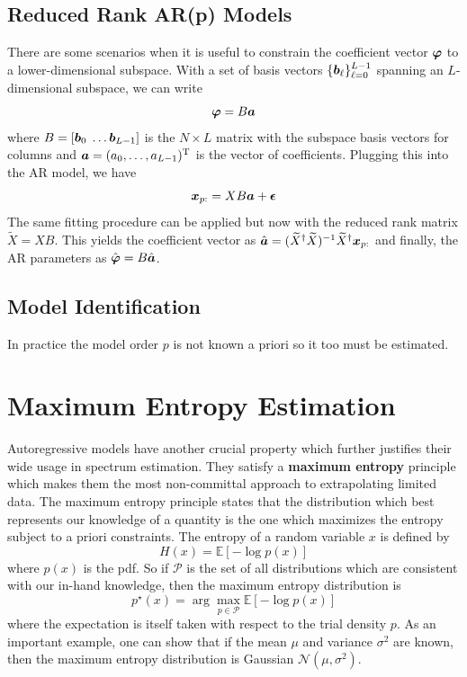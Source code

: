 \documentclass[twocolumn]{gwclass}
\begin{document}
\subsection{Reduced Rank AR(p) Models}
There are some scenarios when it is useful to constrain the coefficient vector $\boldsymbol{\varphi}$ to a lower-dimensional subspace. With a set of basis vectors $\{\boldsymbol{b}_\ell\}_{\ell=0}^{L-1}$ spanning an $L$-dimensional subspace, we can write
$$ \boldsymbol{\varphi} = B\boldsymbol{a} $$
where $B=[\boldsymbol{b}_0\;\dots\boldsymbol{b}_{L-1}]$ is the $N\times L$ matrix with the subspace basis vectors for columns and $\boldsymbol{a}=(a_0,\dots,a_{L-1})^{\text{\normalfont{T}}}$ is the vector of coefficients. Plugging this into the AR model, we have
$$ \boldsymbol{x}_{p:}=XB\boldsymbol{a} + \boldsymbol{\epsilon} $$
The same fitting procedure can be applied but now with the reduced rank matrix $\widetilde{X}=XB$. This yields the coefficient vector as $\hat{\boldsymbol{a}}=(\widetilde{X}^\dagger\widetilde{X})^{-1}\widetilde{X}^\dagger\boldsymbol{x}_{p:}$ and finally, the AR parameters as $\hat{\boldsymbol{\varphi}} = B\hat{\boldsymbol{a}}$.


\subsection{Model Identification}
In practice the model order $p$ is not known a priori so it too must be estimated.
 



\section{Maximum Entropy Estimation}
Autoregressive models have another crucial property which further justifies their wide usage in spectrum estimation. They satisfy a \textbf{maximum entropy} principle which makes them the most non-committal approach to extrapolating limited data. The maximum entropy principle states that the distribution which best represents our knowledge of a quantity is the one which maximizes the entropy subject to a priori constraints. The entropy of a random variable $x$ is defined by
$$ H(x) = \mathbb{E}[-\log p(x)] $$
where $p(x)$ is the pdf. So if $\mathscr{P}$ is the set of all distributions which are consistent with our in-hand knowledge, then the maximum entropy distribution is
$$ p^\star(x) = \arg \max_{p\in\mathscr{P}} \mathbb{E}[-\log p(x)] $$
where the expectation is itself taken with respect to the trial density $p$. As an important example, one can show that if the mean $\mu$ and variance $\sigma^2$ are known, then the maximum entropy distribution is Gaussian $\mathcal{N}(\mu,\sigma^2)$.
\end{document}
